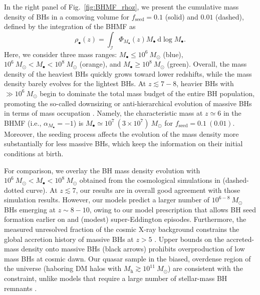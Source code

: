 \documentclass[twocolumn, twocolappendix]{aastex63}
\newcommand{\Msun}{M_\odot}
\newcommand{\Mh}{M_\mathrm{h}}
\newcommand{\Mbh}{M_\bullet}
\newcommand{\fseed}{f_\mathrm{seed}}
\newcommand{\D}{\mathrm{d}}
\begin{document}
\begin{CJK*}{UTF8}{gbsn}
In the right panel of Fig.~\ref{fig:BHMF_rhoz}, we present the cumulative mass density of BHs in a comoving volume
for $\fseed=0.1$ (solid) and $0.01$ (dashed),
defined by the integration of the BHMF as
%
\begin{equation}
 \rho_\bullet(z)=\int_{\mathcal{I}} \Phi_{\Mbh} (z) \Mbh ~\D \log \Mbh.
\end{equation}
%
Here, we consider three mass ranges: $M_\bullet \leq 10^6~\Msun$ (blue), $10^6~\Msun < M_\bullet < 10^8~\Msun$ (orange),
and $M_\bullet \geq 10^8~\Msun$ (green).
Overall, the mass density of the heaviest BHs quickly grows toward lower redshifts,
while the mass density barely evolves for the lightest BHs.
At $z\lesssim 7-8$, heavier BHs with $\gg 10^6~\Msun$ begin to dominate the total mass budget of the entire BH population,
promoting the so-called downsizing or anti-hierarchical evolution of massive BHs 
in terms of mass occupation \citep[e.g.,][]{2014ApJ...786..104U}.
Namely, the characteristic mass at $z\simeq 6$ in the BHMF (i.e., $\alpha_{M_\bullet}=-1$) is $M_\bullet \simeq 10^7~(3\times 10^7)~\Msun$ for 
$\fseed=0.1~(0.01)$.
Moreover, the seeding process affects the evolution of the mass density more substantially for less massive BHs,
which keep the information on their initial conditions at birth.



For comparison, we overlay the BH mass density evolution with $10^6~\Msun<M_{\bullet}<10^8~\Msun$
obtained from the cosmological simulations in \citet{2022MNRAS.513..670N} (dashed-dotted curve).
At $z\lesssim 7$, our results are in overall good agreement with those simulation results.
However, our models predict a larger number of $10^{6-8}~\Msun$ BHs emerging at $z\sim 8-10$,
owing to our model prescription that allows BH seed formation earlier on and (modest) super-Eddington episodes.
Furthermore, the measured unresolved fraction of the cosmic X-ray background constrains
the global accretion history of massive BHs at $z>5$ \citep{2012A&A...545L...6S,2013ApJ...778..130T}.
Upper bounds on the accreted-mass density onto massive BHs (black arrows) prohibits overproduction of low mass BHs at cosmic dawn.
Our quasar sample in the biased, overdense region of the universe (haboring DM halos with $\Mh\gtrsim 10^{11}~\Msun$) 
are consistent with the constraint, unlike models that require a large number of stellar-mass BH remnants \citep[see also][]{2009ApJ...696.1798T}.






\end{CJK*}
\end{document}
